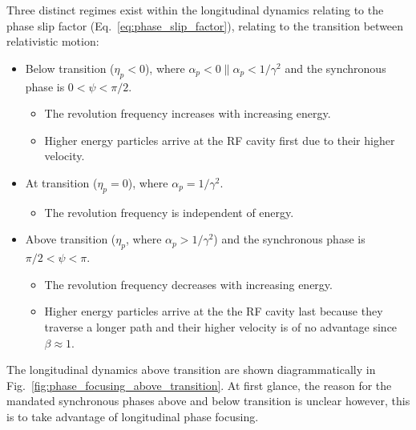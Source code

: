 \documentclass[../main.tex]{subfiles}
\begin{document}
Three distinct regimes exist within the longitudinal dynamics relating to the phase slip factor (Eq.~\ref{eq:phase_slip_factor}), relating to the transition between relativistic motion:
\begin{itemize}
    \item{Below transition ($\eta_{p}<0$), where $\alpha_{p}<0 \parallel \alpha_{p}<1/\gamma^{2}$ and the synchronous phase is $0<\psi<\pi/2$.
    \begin{itemize}
        \item{The revolution frequency increases with increasing energy.}
        \item{Higher energy particles arrive at the RF cavity first due to their higher velocity.}
    \end{itemize}}
    \item{At transition ($\eta_{p}=0$), where $\alpha_{p}=1/\gamma^{2}$.
    \begin{itemize}
        \item{The revolution frequency is independent of energy.} 
    \end{itemize}}
    \item{Above transition ($\eta_{p}$, where $\alpha_{p}>1/\gamma^{2}$) and the synchronous phase is $\pi/2<\psi<\pi$.
    \begin{itemize}
        \item{The revolution frequency decreases with increasing energy.}
        \item{Higher energy particles arrive at the the RF cavity last because they traverse a longer path and their higher velocity is of no advantage since $\beta\approx1$.}
    \end{itemize}}
\end{itemize}
The longitudinal dynamics above transition are shown diagrammatically in Fig.~\ref{fig:phase_focusing_above_transition}. At first glance, the reason for the mandated synchronous phases above and below transition is unclear however, this is to take advantage of longitudinal phase focusing. 
\end{document}
